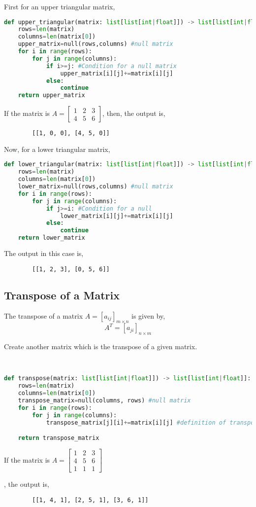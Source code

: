 \begin{explanation}
	First for an upper triangular matrix,
	\begin{lstlisting}[language=Python, numbers=none]
def upper_triangular(matrix: list[list[int|float]]) -> list[list[int|float]]:
    rows=len(matrix)
    columns=len(matrix[0])
    upper_matrix=null(rows,columns) #null matrix
    for i in range(rows):
        for j in range(columns):
            if i>=j: #Condition for a null matrix
                upper_matrix[i][j]+=matrix[i][j]
            else:
                continue
    return upper_matrix \end{lstlisting}
	If the matrix is $A=\begin{bmatrix}
			1 & 2 & 3 \\
			4 & 5 & 6
		\end{bmatrix}$, then, the output is,
	\begin{verbatim}
		[[1, 0, 0], [4, 5, 0]]
	\end{verbatim}
	Now, for a lower triangular matrix,
	\begin{lstlisting}[language=Python, numbers=none]
def lower_triangular(matrix: list[list[int|float]]) -> list[list[int|float]]:
	rows=len(matrix)
	columns=len(matrix[0])
	lower_matrix=null(rows,columns) #null matrix
	for i in range(rows):
		for j in range(columns):
			if j>=i: #Condition for a null
				lower_matrix[i][j]+=matrix[i][j]
			else:
				continue
	return lower_matrix \end{lstlisting}
	The output in this case is,
	\begin{verbatim}
		[[1, 2, 3], [0, 5, 6]]
	\end{verbatim}
\end{explanation}
\subsection{Transpose of a Matrix}
The transpose of a matrix $A=[a_{ij}]_{m\times n}$ is given by,
\[A^T=[a_{ji}]_{n\times m}\]
\begin{eg}
	Create another matrix which is the transpose of a given matrix.
\end{eg}
\begin{explanation}\phantom \\
	\begin{lstlisting}[language=Python, numbers=none]
def transpose(matrix: list[list[int|float]]) -> list[list[int|float]]:
	rows=len(matrix)
	columns=len(matrix[0])
	transpose_matrix=null(columns, rows) #null matrix
	for i in range(rows):
		for j in range(columns):
			transpose_matrix[j][i]+=matrix[i][j] #definition of transpose

	return transpose_matrix \end{lstlisting}
	If the matrix is $A=\begin{bmatrix}
			1 & 2 & 3 \\
			4 & 5 & 6 \\
			1 & 1 & 1
		\end{bmatrix}$
\end{explanation}, the output is,
\begin{verbatim}
		[[1, 4, 1], [2, 5, 1], [3, 6, 1]]
	\end{verbatim}
